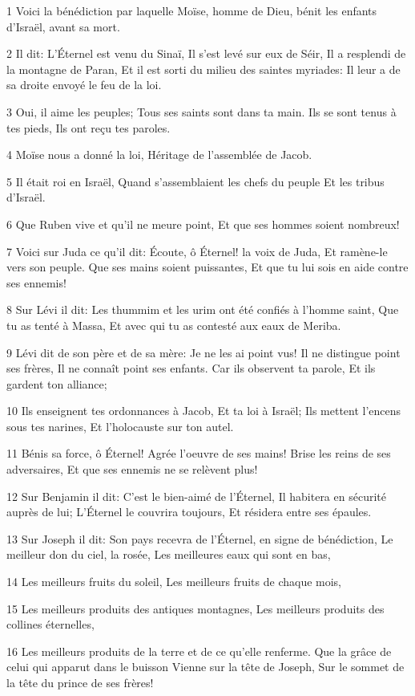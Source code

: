 \par 1 Voici la bénédiction par laquelle Moïse, homme de Dieu, bénit les enfants d'Israël, avant sa mort.
\par 2 Il dit: L'Éternel est venu du Sinaï, Il s'est levé sur eux de Séir, Il a resplendi de la montagne de Paran, Et il est sorti du milieu des saintes myriades: Il leur a de sa droite envoyé le feu de la loi.
\par 3 Oui, il aime les peuples; Tous ses saints sont dans ta main. Ils se sont tenus à tes pieds, Ils ont reçu tes paroles.
\par 4 Moïse nous a donné la loi, Héritage de l'assemblée de Jacob.
\par 5 Il était roi en Israël, Quand s'assemblaient les chefs du peuple Et les tribus d'Israël.
\par 6 Que Ruben vive et qu'il ne meure point, Et que ses hommes soient nombreux!
\par 7 Voici sur Juda ce qu'il dit: Écoute, ô Éternel! la voix de Juda, Et ramène-le vers son peuple. Que ses mains soient puissantes, Et que tu lui sois en aide contre ses ennemis!
\par 8 Sur Lévi il dit: Les thummim et les urim ont été confiés à l'homme saint, Que tu as tenté à Massa, Et avec qui tu as contesté aux eaux de Meriba.
\par 9 Lévi dit de son père et de sa mère: Je ne les ai point vus! Il ne distingue point ses frères, Il ne connaît point ses enfants. Car ils observent ta parole, Et ils gardent ton alliance;
\par 10 Ils enseignent tes ordonnances à Jacob, Et ta loi à Israël; Ils mettent l'encens sous tes narines, Et l'holocauste sur ton autel.
\par 11 Bénis sa force, ô Éternel! Agrée l'oeuvre de ses mains! Brise les reins de ses adversaires, Et que ses ennemis ne se relèvent plus!
\par 12 Sur Benjamin il dit: C'est le bien-aimé de l'Éternel, Il habitera en sécurité auprès de lui; L'Éternel le couvrira toujours, Et résidera entre ses épaules.
\par 13 Sur Joseph il dit: Son pays recevra de l'Éternel, en signe de bénédiction, Le meilleur don du ciel, la rosée, Les meilleures eaux qui sont en bas,
\par 14 Les meilleurs fruits du soleil, Les meilleurs fruits de chaque mois,
\par 15 Les meilleurs produits des antiques montagnes, Les meilleurs produits des collines éternelles,
\par 16 Les meilleurs produits de la terre et de ce qu'elle renferme. Que la grâce de celui qui apparut dans le buisson Vienne sur la tête de Joseph, Sur le sommet de la tête du prince de ses frères!
